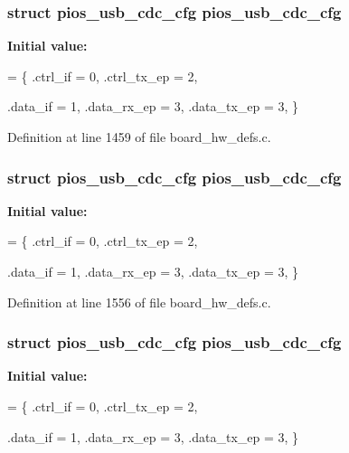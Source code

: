 \hypertarget{group___tau_labs_core_ga05cc3e449d417c7f9097d2659e6f5ca3}{
\subsubsection[{pios\-\_\-usb\-\_\-cdc\-\_\-cfg}]{\setlength{\rightskip}{0pt plus 5cm}struct {\bf pios\-\_\-usb\-\_\-cdc\-\_\-cfg} {\bf pios\-\_\-usb\-\_\-cdc\-\_\-cfg}}}\label{group___tau_labs_core_ga05cc3e449d417c7f9097d2659e6f5ca3}
{\bfseries Initial value\-:}
\begin{DoxyCode}
= \{
        .ctrl\_if = 0,
        .ctrl\_tx\_ep = 2,

        .data\_if = 1,
        .data\_rx\_ep = 3,
        .data\_tx\_ep = 3,
\}
\end{DoxyCode}


Definition at line 1459 of file board\-\_\-hw\-\_\-defs.\-c.

\hypertarget{group___tau_labs_core_ga05cc3e449d417c7f9097d2659e6f5ca3}{
\subsubsection[{pios\-\_\-usb\-\_\-cdc\-\_\-cfg}]{\setlength{\rightskip}{0pt plus 5cm}struct {\bf pios\-\_\-usb\-\_\-cdc\-\_\-cfg} {\bf pios\-\_\-usb\-\_\-cdc\-\_\-cfg}}}\label{group___tau_labs_core_ga05cc3e449d417c7f9097d2659e6f5ca3}
{\bfseries Initial value\-:}
\begin{DoxyCode}
= \{
        .ctrl\_if = 0,
        .ctrl\_tx\_ep = 2,

        .data\_if = 1,
        .data\_rx\_ep = 3,
        .data\_tx\_ep = 3,
\}
\end{DoxyCode}


Definition at line 1556 of file board\-\_\-hw\-\_\-defs.\-c.

\hypertarget{group___tau_labs_core_ga05cc3e449d417c7f9097d2659e6f5ca3}{
\subsubsection[{pios\-\_\-usb\-\_\-cdc\-\_\-cfg}]{\setlength{\rightskip}{0pt plus 5cm}struct {\bf pios\-\_\-usb\-\_\-cdc\-\_\-cfg} {\bf pios\-\_\-usb\-\_\-cdc\-\_\-cfg}}}\label{group___tau_labs_core_ga05cc3e449d417c7f9097d2659e6f5ca3}
{\bfseries Initial value\-:}
\begin{DoxyCode}
= \{
        .ctrl\_if = 0,
        .ctrl\_tx\_ep = 2,

        .data\_if = 1,
        .data\_rx\_ep = 3,
        .data\_tx\_ep = 3,
\}
\end{DoxyCode}


